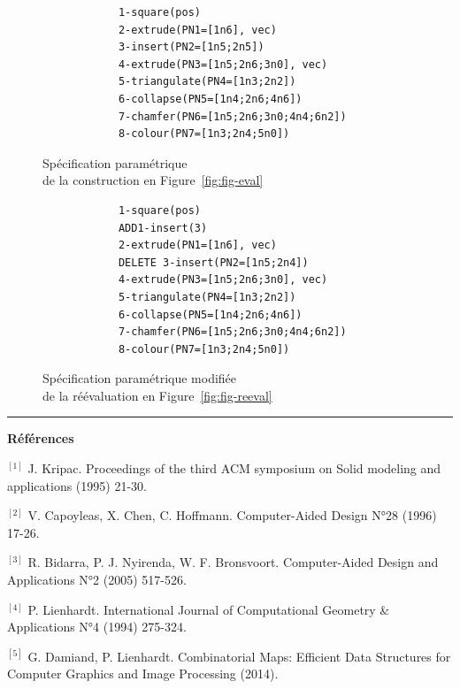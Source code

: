 \documentclass[11pt,a4paper]{article}
\begin{document}
\begin{minipage}[b]{.5\textwidth}
\begin{figure}[H]
	\centering
	\scriptsize
\begin{verbatim}
            1-square(pos)
            2-extrude(PN1=[1n6], vec)
            3-insert(PN2=[1n5;2n5])
            4-extrude(PN3=[1n5;2n6;3n0], vec)
            5-triangulate(PN4=[1n3;2n2])
            6-collapse(PN5=[1n4;2n6;4n6])
            7-chamfer(PN6=[1n5;2n6;3n0;4n4;6n2])
            8-colour(PN7=[1n3;2n4;5n0])
\end{verbatim}
	\caption{Spécification paramétrique\\ de la construction en Figure~\ref{fig:fig-eval}}
	\label{fig:init-spec}
\end{figure}
\end{minipage}
\begin{minipage}[b]{.5\textwidth}
\begin{figure}[H]
    \centering
    \scriptsize
\begin{verbatim}
            1-square(pos)
            ADD1-insert(3)
            2-extrude(PN1=[1n6], vec)
            DELETE 3-insert(PN2=[1n5;2n4])
            4-extrude(PN3=[1n5;2n6;3n0], vec)
            5-triangulate(PN4=[1n3;2n2])
            6-collapse(PN5=[1n4;2n6;4n6])
            7-chamfer(PN6=[1n5;2n6;3n0;4n4;6n2])
            8-colour(PN7=[1n3;2n4;5n0])
\end{verbatim}
	\caption{Spécification paramétrique modifiée\\ de la réévaluation en Figure~\ref{fig:fig-reeval}}
    \label{fig:reval-spec}
\end{figure}
\end{minipage}

\vfill

\begin{flushright}
	\rule{0.85\linewidth}{3pt}
\end{flushright}

\textbf{Références}

{%
	\footnotesize %
	$^{[1]}$ J. Kripac. Proceedings of the third ACM symposium on Solid modeling and applications (1995) 21-30.

	$^{[2]}$ V. Capoyleas, X. Chen, C. Hoffmann. Computer-Aided Design N°28 (1996) 17-26.

	$^{[3]}$ R. Bidarra, P. J. Nyirenda, W. F. Bronsvoort. Computer-Aided Design and Applications N°2 (2005) 517-526.

	$^{[4]}$ P. Lienhardt. International Journal of Computational Geometry \& Applications N°4 (1994) 275-324.

	$^{[5]}$ G. Damiand, P. Lienhardt. Combinatorial Maps: Efficient Data Structures for Computer Graphics and Image Processing (2014).

}
\end{document}
